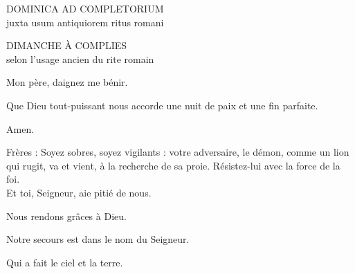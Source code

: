 \documentclass[twoside]{article}
\begin{document}
\null \newpage

\sloppy

\begin{paracol}[1]{2}

\begin{center}\begin{doublespace}

{
\MakeUppercase{\Large Dominica ad Completorium}\\
juxta usum antiquiorem ritus romani}
\end{doublespace}\end{center}

\switchcolumn

\begin{center}\begin{doublespace}
{
\MakeUppercase{\Large Dimanche à Complies}\\
selon l'usage ancien du rite romain
}
\end{doublespace}\end{center}

\switchcolumn*


\switchcolumn

\vv Mon père, daignez me bénir.

\vv Que Dieu tout-puissant nous accorde une nuit de paix et une fin parfaite.

\rr Amen.

\switchcolumn*


\switchcolumn

 \capsaut Frères : Soyez sobres, soyez vigilants : votre adversaire, le démon, comme un lion qui rugit, va et vient, à la recherche de sa proie. Résistez-lui avec la force de la foi. \\
Et toi, Seigneur, aie pitié de nous.

\rr Nous rendons grâces à Dieu.

\switchcolumn*


\switchcolumn

\vv Notre secours \cc est dans le nom du Seigneur.

\rr Qui a fait le ciel et la terre.

\pagebreak


\end{paracol}
\end{document}
